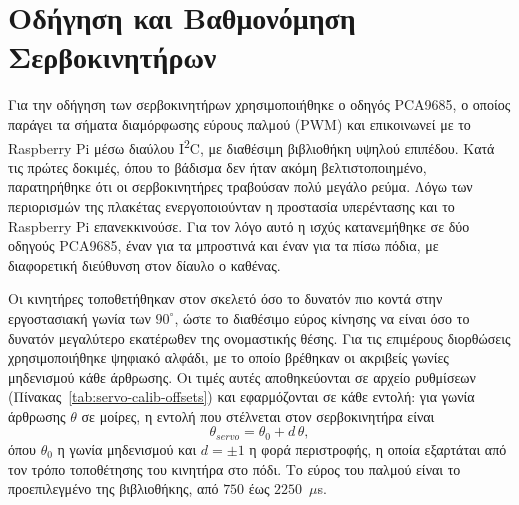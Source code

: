 \documentclass[11pt]{report}
\begin{document}
\section{Οδήγηση και Βαθμονόμηση Σερβοκινητήρων}
\label{sec:servo-calibration}
Για την οδήγηση των σερβοκινητήρων χρησιμοποιήθηκε ο οδηγός PCA9685, ο οποίος
παράγει τα σήματα διαμόρφωσης εύρους παλμού (PWM) και επικοινωνεί με το
Raspberry Pi μέσω διαύλου I\textsuperscript{2}C, με διαθέσιμη βιβλιοθήκη υψηλού
επιπέδου. Κατά τις πρώτες δοκιμές, όπου το βάδισμα δεν ήταν ακόμη
βελτιστοποιημένο, παρατηρήθηκε ότι οι σερβοκινητήρες τραβούσαν πολύ μεγάλο
ρεύμα. Λόγω των περιορισμών της πλακέτας ενεργοποιούνταν η προστασία
υπερέντασης και το Raspberry Pi επανεκκινούσε. Για τον λόγο αυτό η ισχύς
κατανεμήθηκε σε δύο οδηγούς PCA9685, έναν για τα μπροστινά και έναν για τα πίσω
πόδια, με διαφορετική διεύθυνση στον δίαυλο ο καθένας.

Οι κινητήρες τοποθετήθηκαν στον σκελετό όσο το δυνατόν πιο κοντά στην εργοστασιακή γωνία των
$90^\circ$, ώστε το διαθέσιμο εύρος κίνησης να είναι όσο το δυνατόν μεγαλύτερο
εκατέρωθεν της ονομαστικής θέσης. Για τις επιμέρους διορθώσεις χρησιμοποιήθηκε
ψηφιακό αλφάδι, με το οποίο βρέθηκαν οι ακριβείς γωνίες μηδενισμού κάθε
άρθρωσης. Οι τιμές αυτές αποθηκεύονται σε αρχείο ρυθμίσεων
(Πίνακας~\ref{tab:servo-calib-offsets}) και εφαρμόζονται σε κάθε εντολή: για
γωνία άρθρωσης $\theta$ σε μοίρες, η εντολή που στέλνεται στον σερβοκινητήρα
είναι
\begin{equation}
\theta_{servo} = \theta_0 + d\,\theta,
\label{eq:servo-map}
\end{equation}
όπου $\theta_0$ η γωνία μηδενισμού και $d = \pm 1$ η φορά περιστροφής, η οποία
εξαρτάται από τον τρόπο τοποθέτησης του κινητήρα στο πόδι. Το εύρος του
παλμού είναι το προεπιλεγμένο της βιβλιοθήκης, από $750$ έως $2250$~$\mu$s.
\end{document}
